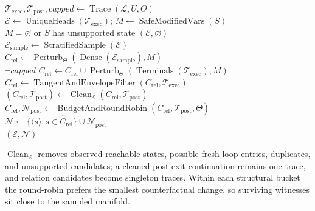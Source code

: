 \begin{algorithm}[H]
\caption{Target-hidden negative-trace sampling}
\label{alg:negative-sampling}
\begin{algorithmic}
\algline \(\mathcal T_{\mathrm{exec}},\mathcal T_{\mathrm{post}},\mathit{capped}
  \leftarrow\operatorname{Trace}(\mathcal L,U,\Theta)\)
  \\
\algline \(\mathcal E\leftarrow\operatorname{UniqueHeads}(\mathcal T_{\mathrm{exec}})\);
  \quad \(M\leftarrow\operatorname{SafeModifiedVars}(S)\)\\
\algline {} \(M=\varnothing\) or \(S\) has unsupported state
   \((\mathcal E,\varnothing)\)\\
\algline \(\mathcal E_{\mathrm{sample}}\leftarrow
  \operatorname{StratifiedSample}(\mathcal E)\)\\
\algline \(C_{\mathrm{rel}}\leftarrow
  \operatorname{Perturb}_{\Theta}(\operatorname{Dense}(\mathcal E_{\mathrm{sample}}),M)\)\\
\algline {} \(\neg\mathit{capped}\) 
  \(C_{\mathrm{rel}}\leftarrow C_{\mathrm{rel}}\cup
  \operatorname{Perturb}_{\Theta}(\operatorname{Terminals}(\mathcal T_{\mathrm{exec}}),M)\)\\
\algline \(C_{\mathrm{rel}}\leftarrow
  \operatorname{TangentAndEnvelopeFilter}(C_{\mathrm{rel}},
  \mathcal T_{\mathrm{exec}})\)\\
\algline \((C_{\mathrm{rel}},\mathcal T_{\mathrm{post}})
  \leftarrow\operatorname{Clean}_{\mathcal E}
  (C_{\mathrm{rel}},\mathcal T_{\mathrm{post}})\)\\
\algline \(\widehat C_{\mathrm{rel}},\mathcal N_{\mathrm{post}}
  \leftarrow\operatorname{BudgetAndRoundRobin}
  (C_{\mathrm{rel}},\mathcal T_{\mathrm{post}},\Theta)\)\\
\algline \(\mathcal N\leftarrow
  \{\langle s\rangle:s\in \widehat C_{\mathrm{rel}}\}\cup\mathcal N_{\mathrm{post}}\)\\
\algline {} \((\mathcal E,\mathcal N)\)\\
\end{algorithmic}
\end{algorithm}

\(\operatorname{Clean}_{\mathcal E}\) removes observed reachable states,
possible fresh loop entries, duplicates, and unsupported candidates; a
cleaned post-exit continuation remains one trace, and relation candidates
become singleton traces.  Within each structural bucket the round-robin
prefers the smallest counterfactual change, so surviving witnesses sit close
to the sampled manifold.

